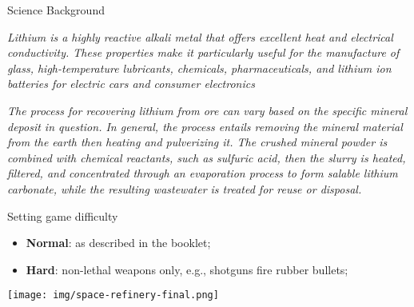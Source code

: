 \medskip
\begin{rpg-commentbox}{Science Background}
\begin{small}
\textit{Lithium is a highly reactive alkali metal that offers excellent heat and electrical conductivity.  These properties make it particularly useful for the manufacture of glass, high-temperature lubricants, chemicals, pharmaceuticals, and lithium ion batteries for electric cars and consumer electronics}

\textit{The process for recovering lithium from ore can vary based on the specific mineral deposit in question. In general, the process entails removing the mineral material from the earth then heating and pulverizing it. The crushed mineral powder is combined with chemical reactants, such as sulfuric acid, then the slurry is heated, filtered, and concentrated through an evaporation process to form salable lithium carbonate, while the resulting wastewater is treated for reuse or disposal.}    
\end{small}
\end{rpg-commentbox}



\medskip
\begin{rpg-commentbox}{Setting game difficulty}
\begin{itemize}
    \item \textbf{Normal}: as described in the booklet;
    \item \textbf{Hard}: non-lethal weapons only, e.g., shotguns fire rubber bullets;
\end{itemize}
\end{rpg-commentbox}

\newsect

\newpage

\begin{sidewaysfigure*}
    \centering
    \texttt{[image: img/space-refinery-final.png]}
    \label{fig:refinery}
\end{sidewaysfigure*}

\newpage